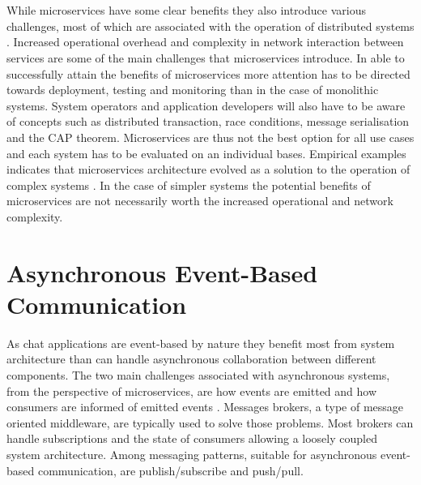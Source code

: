 \\ \\
While microservices have some clear benefits they also introduce various challenges, most of which are associated with the operation of distributed systems \cite{deutsch2004eight}. Increased operational overhead and complexity in network interaction between services are some of the main challenges that microservices introduce. In able to successfully attain the benefits of microservices more attention has to be directed towards deployment, testing and monitoring than in the case of monolithic systems. System operators and application developers will also have to be aware of concepts such as distributed transaction, race conditions, message serialisation and the CAP theorem. Microservices are thus not the best option for all use cases and each system has to be evaluated on an individual bases. Empirical examples indicates that microservices architecture evolved as a solution to the operation of complex systems \cite{thones2015microservices, microservicesNetflix}. In the case of simpler systems the potential benefits of microservices are not necessarily worth the increased operational and network complexity.

\section{Asynchronous Event-Based Communication}

As chat applications are event-based by nature they benefit most from system architecture than can handle asynchronous collaboration between different components. The two main challenges associated with asynchronous systems, from the perspective of microservices, are how events are emitted and how consumers are informed of emitted events \cite{newman2015building}. Messages brokers, a type of message oriented middleware, are typically used to solve those problems. Most brokers can handle subscriptions and the state of consumers allowing a loosely coupled system architecture. Among messaging patterns, suitable for asynchronous event-based communication, are publish/subscribe and push/pull.

